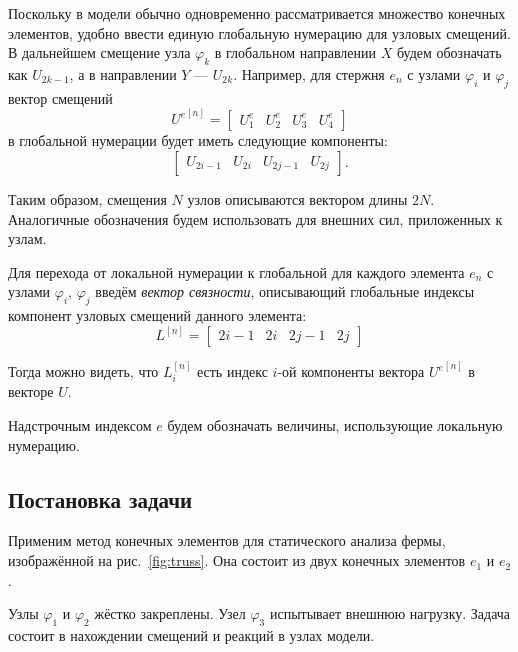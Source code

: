 \documentclass[10pt]{article}
\numberwithin{equation}{section}
\renewcommand{\phi}{\varphi}
\newcommand{\figref}[1]{рис. \ref{#1}}
\newcommand{\node}[1]{$\phi_{#1}$}
\newcommand{\element}[1]{$e_{#1}$}
\begin{document}
Поскольку в модели обычно одновременно рассматривается множество
конечных элементов, удобно ввести единую глобальную нумерацию для
узловых смещений. В дальнейшем смещение узла \node{k} в глобальном
направлении $X$ будем обозначать как $U_{2k-1}$, а в направлении $Y$ —
$U_{2k}$. Например, для стержня \element{n} с узлами \node{i} и \node{j} вектор
смещений
\begin{equation*}
  {U^e}^{[n]}=
  \begin{bmatrix}
    U_1^e & U_2^e & U_3^e & U_4^e
  \end{bmatrix}
\end{equation*}
в глобальной нумерации будет иметь следующие компоненты:
\begin{equation}
  \label{eq:global-numbering}
  \begin{bmatrix}
    U_{2i-1} & U_{2i} & U_{2j-1} & U_{2j}
  \end{bmatrix}.
\end{equation}
 
Таким образом, смещения $N$ узлов описываются вектором длины $2N$.
Аналогичные обозначения будем использовать для внешних сил,
приложенных к узлам.

Для перехода от локальной нумерации к глобальной для каждого элемента
\element{n} с узлами \node{i}, \node{j} введём \emph{вектор
  связности}, описывающий глобальные индексы компонент узловых
смещений данного элемента:
\begin{equation}
  \label{eq:glob-num-vector}
  L^{[n]} =
  \begin{bmatrix}
    2i-1 & 2i & 2j-1 & 2j
  \end{bmatrix}
\end{equation}

Тогда можно видеть, что $L_i^{[n]}$ есть индекс $i$-ой компоненты
вектора ${U^e}^{[n]}$ в векторе $U$.

Надстрочным индексом $e$ будем обозначать величины, использующие локальную
нумерацию.

\subsection{Постановка задачи}

Применим метод конечных элементов для статического анализа фермы,
изображённой на \figref{fig:truss}. Она состоит из двух конечных
элементов \element{1} и \element{2}.



Узлы \node{1} и \node{2} жёстко закреплены. Узел \node{3} испытывает
внешнюю нагрузку. Задача состоит в нахождении смещений и реакций в
узлах модели.
\end{document}
